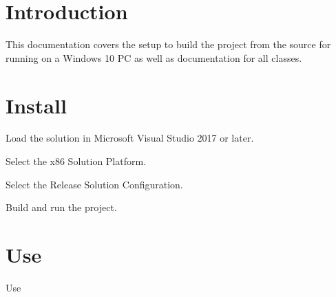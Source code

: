 \section{Introduction}\label{index_sec_intro}
This documentation covers the setup to build the project from the source for running on a Windows 10 PC as well as documentation for all classes.\section{Install}\label{index_sec_running}

\begin{DoxyEnumerate}
\item Load the solution in Microsoft Visual Studio 2017 or later.
\item Select the x86 Solution Platform.
\item Select the Release Solution Configuration.
\item Build and run the project.
\end{DoxyEnumerate}\section{Use}\label{index_sec_use}
Use 